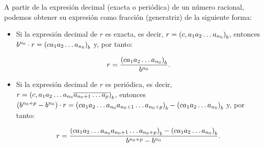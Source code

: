 A partir de la expresión decimal (exacta o periódica) de un número racional, podemos obtener su expresión como fracción (generatriz) de la siguiente forma:

\begin{itemize}
  \item  Si la expresión decimal de $r$ es exacta, es decir, $r=\left(c,a_1a_2\dots a_{n_0}\right)_b$, entonces $b^{n_0}\cdot r=\left(ca_1a_2\dots a_{n_0}\right)_b$ y, por tanto:
  
  \begin{equation}
    r=\frac{\left(ca_1a_2\dots a_{n_0}\right)_b}{b^{n_0}}.
  \end{equation}
  \item  Si la expresión decimal de $r$ es periódica, es decir, $r=\left(c,a_1a_2\dots a_{n_0}\overline{a_{n_0+1}\dots a_p}\right)_b$, entonces $\left(b^{n_0+p}-b^{n_0}\right)\cdot r=\left(ca_1a_2\dots a_{n_0}a_{n_0+1}\dots a_{n_0+p}\right)_b-\left(ca_1a_2\dots a_{n_0}\right)_b$ y, por tanto:
  
  \begin{equation}
    r=\frac{\left(ca_1a_2\dots a_{n_0}a_{n_0+1}\dots a_{n_0+p}\right)_b-\left(ca_1a_2\dots a_{n_0}\right)_b}{b^{n_0+p}-b^{n_0}}.
  \end{equation}
\end{itemize}